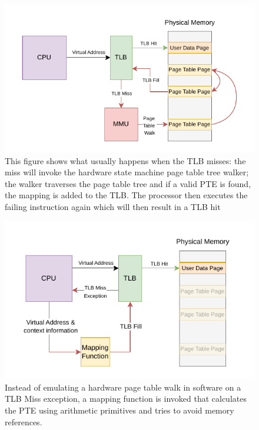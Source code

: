 \begin{figure}[ht!]
    \centering
    \includegraphics[scale=1.5]{figures/theory_normal_tlb_miss.pdf}
    \caption[Usual TLB Miss]{This figure shows what usually happens when the TLB misses:
        the miss will invoke the hardware state machine page table tree walker; the walker traverses
        the page table tree and if a valid PTE is found, the mapping is added to the TLB. The processor
        then executes the failing instruction again which will then result in a TLB hit}
    \label{fig:theory:normal_tlb_miss}
\end{figure}
\begin{figure}[t]
    \centering
    \includegraphics[scale=1.5]{figures/theory_mapping_fx.pdf}
    \caption[Virtual Memory using a mapping function]{Instead of emulating a hardware page table walk in software on
        a TLB Miss exception, a mapping function is invoked that calculates the PTE using arithmetic primitives and tries
        to avoid memory references.}
    \label{fig:theory:mapping_fx}
\end{figure}

